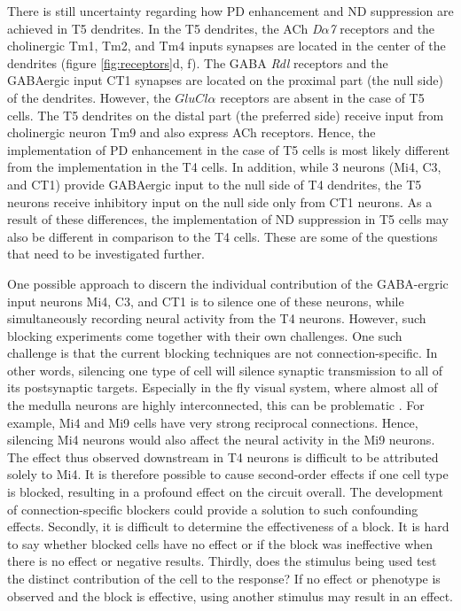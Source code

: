 There is still uncertainty regarding how PD enhancement and ND suppression are achieved in T5 dendrites. In the T5 dendrites, the ACh \textit{D$\alpha$7} receptors and the cholinergic Tm1, Tm2, and Tm4 inputs synapses are located in the center of the dendrites (figure \ref{fig:receptors}d, f). The GABA \textit{Rdl} receptors and the GABAergic input CT1 synapses are located on the proximal part (the null side) of the dendrites. However, the \textit{$GluCl\alpha$} receptors are absent in the case of T5 cells. The T5 dendrites on the distal part (the preferred side) receive input from cholinergic neuron Tm9 and also express ACh receptors. Hence, the implementation of PD enhancement in the case of T5 cells is most likely different from the implementation in the T4 cells. In addition, while 3 neurons (Mi4, C3, and CT1) provide GABAergic input to the null side of T4 dendrites, the T5 neurons receive inhibitory input on the null side only from CT1 neurons. As a result of these differences, the implementation of ND suppression in T5 cells may also be different in comparison to the T4 cells. These are some of the questions that need to be investigated further. 

One possible approach to discern the individual contribution of the GABA-ergric input neurons Mi4, C3, and CT1 is to silence one of these neurons, while simultaneously recording neural activity from the T4 neurons. However, such blocking experiments come together with their own challenges. One such challenge is that the current blocking techniques are not connection-specific. In other words, silencing one type of cell will silence synaptic transmission to all of its postsynaptic targets. Especially in the fly visual system, where almost all of the medulla neurons are highly interconnected, this can be problematic \parencite{Takemura2017}. For example, Mi4 and Mi9 cells have very strong reciprocal connections. Hence, silencing Mi4 neurons would also affect the neural activity in the Mi9 neurons. The effect thus observed downstream in T4 neurons is difficult to be attributed solely to Mi4. It is therefore possible to cause second-order effects if one cell type is blocked, resulting in a profound effect on the circuit overall. The development of connection-specific blockers could provide a solution to such confounding effects. Secondly, it is difficult to determine the effectiveness of a block. It is hard to say whether blocked cells have no effect or if the block was ineffective when there is no effect or negative results. Thirdly, does the stimulus being used test the distinct contribution of the cell to the response? If no effect or phenotype is observed and the block is effective, using another stimulus may result in an effect.

